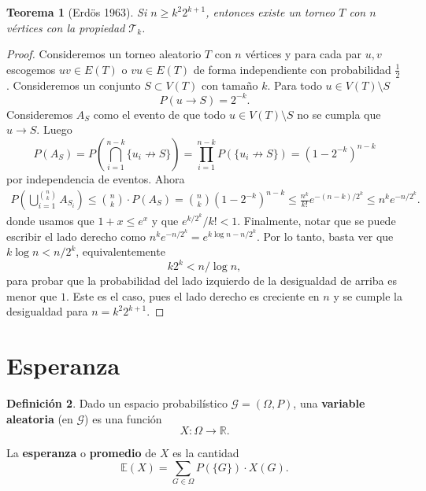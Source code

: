 \documentclass[12pt]{report}
\theoremstyle{plain}
\newtheorem{theorem}{Teorema}[section]
\theoremstyle{definition}
\newtheorem{definition}[theorem]{Definición}
\newcommand{\reals}{\mathbb{R}}
\begin{document}
\begin{theorem}[Erdös 1963]
Si $n \geq k^2 2^{k+1}$, entonces existe un torneo $T$ con $n$ vértices con la propiedad $\mathcal T_k$.

\end{theorem}
\begin{proof}
Consideremos un torneo aleatorio $T$ con $n$ vértices y para cada par $u,v$ escogemos $uv \in E(T)$ o $vu \in E(T)$ de forma independiente con probabilidad $\frac 1 2$. Consideremos un conjunto $S \subset V(T)$ con tamaño $k$. Para todo $u \in V(T) \setminus S$
\[
    P(u \to S) = 2^{-k}.
\]
Consideremos $A_S$ como el evento de que todo $u \in V(T) \setminus S$ no se cumpla que $u \to S$. Luego
\[
    P(A_S) = P(\bigcap_{i = 1}^{n-k} \{u_i \not \to S\}) = \prod_{i = 1}^{n-k} P(\{ u_i \not \to S \}) = (1 - 2^{-k})^{n-k}
\]
por independencia de eventos. Ahora
\begin{align*}
P(\bigcup_{i = 1}^{\binom n k} A_{S_i}) \leq \binom n k \cdot P(A_{S}) = \binom n k (1 - 2^{-k})^{n-k} \leq \frac{n^k}{k!} e^{-(n-k)/2^k} \leq n^k e^{-n /2^k}.
\end{align*}
donde usamos que $1 + x \leq e^x$ y que $e^{k/2^k}/k! < 1$. Finalmente, notar que se puede escribir el lado derecho como $n^{k}e^{-n/2^k}= e^{k \log n - n/ 2^k}$. Por lo tanto, basta ver que $k \log n < n / 2^k$, equivalentemente
\[
    k 2^k < n / \log n,
\]
para probar que la probabilidad del lado izquierdo de la desigualdad de arriba es menor que $1$. Este es el caso, pues el lado derecho es creciente en $n$ y se cumple la desigualdad para $n = k^2 2^{k+1}$.
\end{proof}







\section{Esperanza}

\begin{definition}
Dado un espacio probabilístico $\mathcal G = (\Omega, P)$, una \textbf{variable aleatoria} (en $\mathcal G$) es una función
\[
    X: \Omega \longrightarrow \reals.
\]

La \textbf{esperanza} o \textbf{promedio} de $X$ es la cantidad
\[
    \mathbb{E} (X) = \sum_{G \in \Omega} P (\{G\}) \cdot X (G).
\]
\end{definition}
\end{document}
